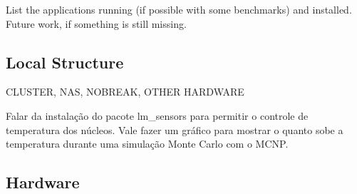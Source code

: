 \documentclass[twoside,a4paper,12pt,english]{inac19}
\begin{document}
List the applications running (if possible with some benchmarks) and installed. 
Future work, if something is still missing.

\subsection{Local Structure}
CLUSTER, NAS, NOBREAK, OTHER HARDWARE

Falar da instalação do pacote lm\_sensors para permitir o controle de temperatura dos núcleos. Vale fazer um gráfico para mostrar o quanto sobe 
a temperatura durante uma simulação Monte Carlo com o MCNP.





\subsection{Hardware}
\end{document}
